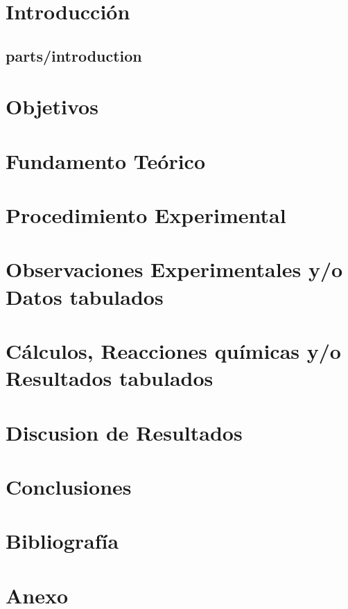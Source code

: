 \documentclass[12pt, a4paper]{article}
\begin{document}


\pagestyle{fancy}
\fancyfoot{} %
\fancyfoot[R]{\thepage}

\tableofcontents
\clearpage

\section{Introducción}
\subsection{parts/introduction}

\section{Objetivos}


\section{Fundamento Teórico}


\section{Procedimiento Experimental}


\section{Observaciones Experimentales y/o Datos tabulados}


\section{Cálculos, Reacciones químicas y/o Resultados tabulados}


\section{Discusion de Resultados}


\section{Conclusiones}


\section{Bibliografía}
\printbibliography

\clearpage

\listoffigures
\listoftables

\clearpage

\section{Anexo}
\end{document}
